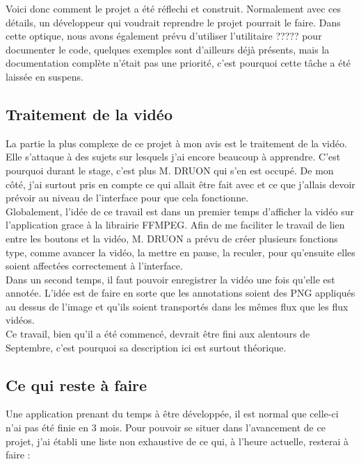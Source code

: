 \documentclass[11pt,french,a4paper]{report}
\begin{document}
Voici donc comment le projet a été réflechi et construit. Normalement avec ces détails, un développeur qui voudrait reprendre
le projet pourrait le faire. Dans cette optique, nous avons également prévu d'utiliser %
l'utilitaire ????? pour documenter le code, quelques exemples sont d'ailleurs déjà présents, mais la documentation 
complète n'était pas une priorité, c'est pourquoi cette tâche a été laissée en suspens. 
       
        \subsection{Traitement de la vidéo}
La partie la plus complexe de ce projet à mon avis est le traitement de la vidéo. Elle s'attaque à des sujets sur lesquels j'ai 
encore beaucoup à apprendre. C'est pourquoi durant le stage, c'est plus M. DRUON qui s'en est occupé. De mon côté, j'ai surtout
pris en compte ce qui allait être fait avec et ce que j'allais devoir prévoir au niveau de l'interface pour que cela fonctionne. \\

Globalement, l'idée de ce travail est dans un premier temps d'afficher la vidéo sur l'application grace à 
la librairie FFMPEG. Afin de me faciliter
le travail de lien entre les boutons et la vidéo, M. DRUON a prévu de créer plusieurs fonctions type, comme avancer la vidéo, la 
mettre en pause, la reculer, pour qu'ensuite elles soient affectées correctement à l'interface. \\

Dans un second temps, il faut pouvoir enregistrer la vidéo une fois qu'elle est annotée. L'idée est de faire en sorte que les annotations
soient des PNG appliqués au dessus de l'image et qu'ils soient transportés dans les mêmes flux que les flux vidéos. \\

Ce travail, bien qu'il a été commencé, devrait être fini aux alentours de Septembre, c'est pourquoi sa description ici
est surtout théorique. \\


        \subsection{Ce qui reste à faire}
Une application prenant du temps à être développée, il est normal que celle-ci n'ai pas été finie en 3 mois. Pour pouvoir se situer
dans l'avancement de ce projet, j'ai établi une liste non exhaustive de ce qui, à l'heure actuelle, resterai à faire : \\ 
\end{document}
